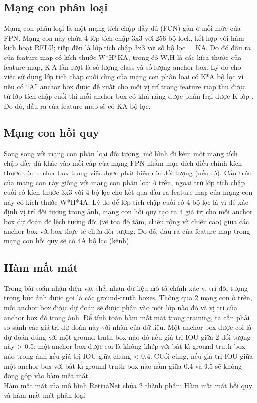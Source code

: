 \documentclass[a4paper, 12pt]{report}
\begin{document}
\subsection{Mạng con phân loại}
Mạng con phân loại là một mạng tích chập đầy đủ (FCN) gắn ở mỗi mức của FPN. Mạng con này chứa 4 lớp tích chập 3x3 với 256 bộ lock, kết hợp với hàm kích hoạt RELU; tiếp đến là lớp tích chập 3x3 với số bộ lọc = KA. Do đó đầu ra của feature map có kích thước W*H*KA, trong đó W,H là các kích thước của feature map, K,A lần lượt là số lượng class và số lượng anchor box. Lý do cho việc sử dụng lớp tích chập cuối cùng của mạng con phân loại có K*A  bộ lọc vì nếu có “A” anchor box được đề xuất cho mỗi vị trí trong feature map thu được từ lớp tích chập cuối thì mỗi anchor box  có khả năng được phân loại được K lớp .  Do đó, đầu ra của feature map sẽ có KA bộ lọc.

\subsection{Mạng con hồi quy}
Song song với mạng con phân loại đối tượng, mô hình đi kèm một mạng tích chập đầy đủ khác vào mỗi cấp của mạng FPN nhằm mục đích điều chỉnh kích thước các anchor box trong việc  được phát hiện các đối tượng (nếu có).  Cấu trúc của mạng con này giống với mạng con phân loại ở trên, ngoại trừ lớp tích chập cuối có kích thước 3x3 với 4 bộ lọc cho kết quả đầu ra feature map của mạng con này có kích thước W*H*4A.  Lý do để lớp tích chập cuối có 4 bộ lọc là vì để xác định vị trí đối tượng trong ảnh, mạng con hồi quy tạo ra 4 giá trị cho mỗi anchor box  dự đoán độ lệch tương đối (về tọa độ tâm, chiều rộng và chiều cao) giữa các anchor box với  box thực tế chứa đối tượng. Do đó, đầu ra của feature map  trong mạng con hồi quy sẽ có 4A bộ lọc (kênh)


\subsection{Hàm mất mát}
\hspace*{1cm}Trong bài toán nhận diện vật thể, nhãn dữ liệu mô tả chính xác vị trí đối tượng trong bức ảnh được gọi là các ground-truth boxes. Thông qua 2 mạng con ở trên, mỗi anchor box được dự đoán sẽ được phân vào một lớp nào đó và vị trí của anchor box đó trong ảnh. Để tính toán hàm mất mát trong training, ta cần phải so sánh các giá trị dự đoán này với nhãn của dữ liệu.  Một anchor box được coi là dự đoán đúng với một ground truth box nào đó nếu giá trị IOU giữa 2 đối tượng này > 0.5; một anchor box được coi là không khớp với bất kì ground truth box nào trong ảnh nếu giá trị IOU giữa chúng < 0.4.  CUối cùng, nếu giá trị IOU giữa một anchor box với bất kì ground truth box nào nằm giữa 0.4 và 0.5 sẽ không đóng góp vào hàm mất mát. \\
\hspace*{1cm}
Hàm mất mát của mô hình RetinaNet chứa 2 thành phần: Hàm mất mát hồi quy và hàm mất mát phân loại
\end{document}

